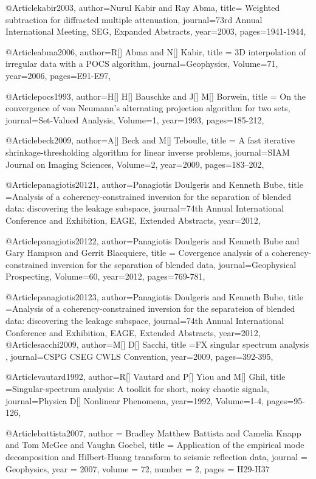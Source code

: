 @Article{kabir2003,
  author={Nurul Kabir and Ray Abma},
  title={	Weighted subtraction for diffracted multiple attenuation},
  journal={73rd Annual International Meeting, SEG, Expanded Abstracts},
  year=2003,
  pages={1941-1944},
}

@Article{abma2006,
  author={R[] Abma and N[] Kabir},
  title = {3{D} interpolation of irregular data with a {POCS} algorithm},
  journal={Geophysics},
  Volume=71,
  year=2006,
  pages={E91-E97},
}

@Article{pocs1993,
  author={H[] H[] Bauschke and J[] M[] Borwein},
  title = {On the convergence of von Neumann's alternating projection algorithm for two sets},
  journal={Set-Valued Analysis},
  Volume=1,
  year=1993,
  pages={185-212},
}


@Article{beck2009,
  author={A[] Beck and M[] Teboulle},
  title = {A fast iterative shrinkage-thresholding algorithm for
linear inverse problems},
  journal={SIAM Journal on Imaging Sciences},
  Volume=2,
  year=2009,
  pages={183–202},
}

@Article{panagiotis20121,
  author={Panagiotis Doulgeris and Kenneth Bube},
  title ={Analysis of a coherency-constrained inversion for the separation of blended data: discovering the leakage subspace},
  journal={74th Annual International Conference and Exhibition, EAGE, Extended Abstracts},
  year=2012,
  }

@Article{panagiotis20122,
  author={Panagiotis Doulgeris and Kenneth Bube and Gary Hampson and Gerrit Blacquiere},
  title = {Covergence analysis of a coherency-constrained inversion for the separation of blended data},
  journal={Geophysical Prospecting},
  Volume=60,
  year=2012,
  pages={769-781},
}

@Article{panagiotis20123,
  author={Panagiotis Doulgeris and Kenneth Bube},
  title ={Analysis of a coherency-constrained inversion for the separateion of blended data: discovering the leakage subspace},
  journal={74th Annual International Conference and Exhibition, EAGE, Extended Abstracts},
  year=2012,
  }
@Article{sacchi2009,
  author={M[] D[] Sacchi},
  title ={{FX} singular spectrum analysis },
  journal={CSPG CSEG CWLS Convention},
  year=2009,
  pages={392-395},
}


@Article{vautard1992,
  author={R[] Vautard and P[] Yiou and M[] Ghil},
  title ={Singular-spectrum analysis: A toolkit for short, noisy chaotic signals},
  journal={Physica D[] Nonlinear Phenomena},
  year=1992,
  Volume=1-4,
  pages={95-126},
}

@Article{battista2007,
  author = 	 {Bradley Matthew Battista and Camelia Knapp and Tom McGee and Vaughn Goebel},
  title = 	 {Application of the empirical mode decomposition and
{Hilbert-Huang} transform to seismic reflection data},
  journal = 	 {Geophysics},
  year = 	 2007,
  volume = 	 72,
  number = 	 2,
  pages = 	 {H29-H37}}

